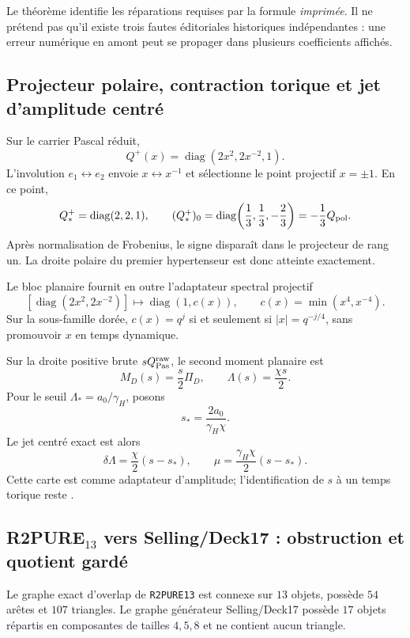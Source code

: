 \begin{guardrail}
Le théorème identifie les réparations requises par la formule \emph{imprimée}. Il ne prétend pas
qu'il existe trois fautes éditoriales historiques indépendantes : une erreur numérique en amont peut
se propager dans plusieurs coefficients affichés.
\end{guardrail}

\subsection{Projecteur polaire, contraction torique et jet d'amplitude centré}

Sur le carrier Pascal réduit,
\[
 Q^+(x)=\operatorname{diag}(2x^2,2x^{-2},1).
\]
L'involution $e_1\leftrightarrow e_2$ envoie $x\leftrightarrow x^{-1}$ et sélectionne le point
projectif $x=\pm1$. En ce point,
\[
 Q_*^+=\operatorname{diag}(2,2,1),\qquad
 (Q_*^+)_0=\operatorname{diag}\!\left(\frac13,\frac13,-\frac23\right)
 =-\frac13Q_{\rm pol}.
\]
Après normalisation de Frobenius, le signe disparaît dans le projecteur de rang un. La droite
polaire du premier hypertenseur est donc atteinte exactement.

Le bloc planaire fournit en outre l'adaptateur spectral projectif
\[
 [\operatorname{diag}(2x^2,2x^{-2})]\longmapsto
 \operatorname{diag}(1,c(x)),
 \qquad
 c(x)=\min(x^4,x^{-4}).
\]
Sur la sous-famille dorée, $c(x)=q^j$ si et seulement si
$|x|=q^{-j/4}$, sans promouvoir $x$ en temps dynamique.

Sur la droite positive brute $sQ_{\rm Pas}^{\rm raw}$, le second moment planaire est
\[
 M_D(s)=\frac{s}{2}\Pi_D,
 \qquad \Lambda(s)=\frac{\chi s}{2}.
\]
Pour le seuil $\Lambda_*=a_0/\gamma_H$, posons
\[
 s_*=\frac{2a_0}{\gamma_H\chi}.
\]
Le jet centré exact est alors
\[
 \boxed{\delta\Lambda=\frac\chi2(s-s_*),\qquad
 \mu=\frac{\gamma_H\chi}{2}(s-s_*).}
\]
Cette carte est \certProven{} comme adaptateur d'amplitude; l'identification de $s$ à un temps
torique reste \certSeparated{}.

\subsection{R2PURE$_{13}$ vers Selling/Deck17 : obstruction et quotient gardé}

Le graphe exact d'overlap de \texttt{R2PURE13} est connexe sur $13$ objets, possède $54$ arêtes
et $107$ triangles. Le graphe générateur Selling/Deck17 possède $17$ objets répartis en composantes
de tailles $4,5,8$ et ne contient aucun triangle.

